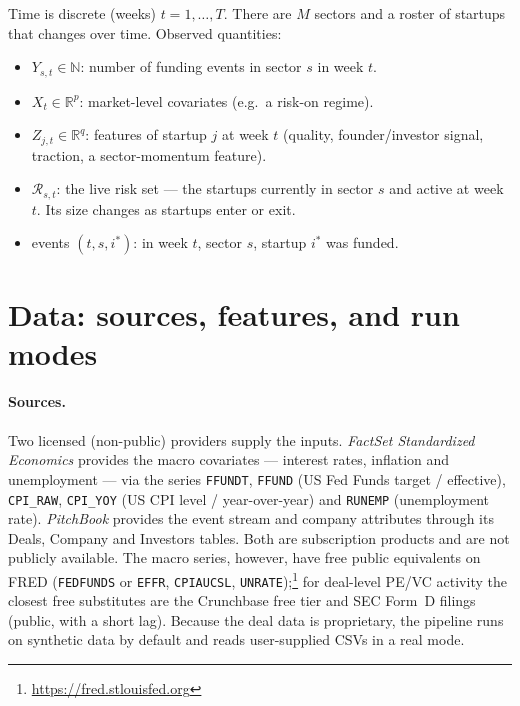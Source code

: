 \documentclass[11pt]{article}
\newcommand{\code}[1]{\texttt{#1}}
\newcommand{\Rset}{\mathcal{R}}
\begin{document}
Time is discrete (weeks) $t=1,\dots,T$. There are $M$ sectors and a roster of startups
that changes over time. Observed quantities:
\begin{itemize}[leftmargin=1.4em,itemsep=1pt]
\item $Y_{s,t}\in\mathbb{N}$: number of funding events in sector $s$ in week $t$.
\item $X_t\in\mathbb{R}^{p}$: market-level covariates (e.g.\ a risk-on regime).
\item $Z_{j,t}\in\mathbb{R}^{q}$: features of startup $j$ at week $t$ (quality,
founder/investor signal, traction, a sector-momentum feature).
\item $\Rset_{s,t}$: the live risk set --- the startups currently in sector $s$ and
active at week $t$. Its size changes as startups enter or exit.
\item events $(t,s,i^\ast)$: in week $t$, sector $s$, startup $i^\ast$ was funded.
\end{itemize}

\section{Data: sources, features, and run modes}
\label{sec:data}

\paragraph{Sources.} Two licensed (non-public) providers supply the inputs.
\emph{FactSet Standardized Economics} provides the macro covariates --- interest
rates, inflation and unemployment --- via the series \code{FFUNDT}, \code{FFUND} (US
Fed Funds target / effective), \code{CPI\_RAW}, \code{CPI\_YOY} (US CPI level /
year-over-year) and \code{RUNEMP} (unemployment rate). \emph{PitchBook} provides the
event stream and company attributes through its Deals, Company and Investors tables.
Both are subscription products and are not publicly available. The macro series,
however, have free public equivalents on FRED (\code{FEDFUNDS} or \code{EFFR},
\code{CPIAUCSL}, \code{UNRATE});\footnote{\url{https://fred.stlouisfed.org}} for
deal-level PE/VC activity the closest free substitutes are the Crunchbase free tier and
SEC Form~D filings (public, with a short lag). Because the deal data is proprietary, the
pipeline runs on synthetic data by default and reads user-supplied CSVs in a real mode.
\end{document}
